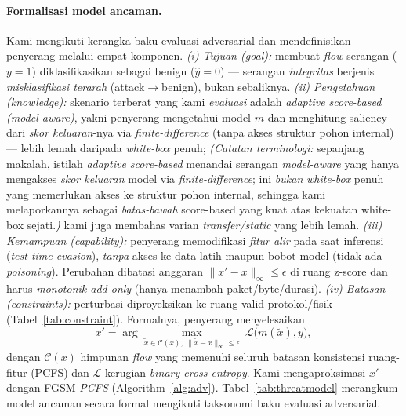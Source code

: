 \documentclass[11pt,a4paper]{article}
\begin{document}
\paragraph{Formalisasi model ancaman.} Kami mengikuti kerangka baku evaluasi
adversarial dan mendefinisikan penyerang melalui empat komponen.
\emph{(i) Tujuan (goal):} membuat \emph{flow} serangan ($y=1$) diklasifikasikan
sebagai benign ($\hat{y}=0$) --- serangan \emph{integritas} berjenis
\emph{misklasifikasi terarah} (attack$\rightarrow$benign), bukan sebaliknya.
\emph{(ii) Pengetahuan (knowledge):} skenario terberat yang kami \emph{evaluasi} adalah \emph{adaptive score-based (model-aware)}, yakni penyerang mengetahui model $m$ dan menghitung saliency dari \emph{skor keluaran}-nya via \emph{finite-difference} (tanpa akses struktur pohon internal) --- lebih lemah daripada \emph{white-box} penuh; \emph{(Catatan terminologi:} sepanjang makalah, istilah \emph{adaptive score-based} menandai serangan \emph{model-aware} yang hanya mengakses \emph{skor keluaran} model via \emph{finite-difference}; ini \emph{bukan} \emph{white-box} penuh yang memerlukan akses ke struktur pohon internal, sehingga kami melaporkannya sebagai \emph{batas-bawah} score-based yang kuat atas kekuatan white-box sejati.\emph{)} kami juga membahas varian \emph{transfer/static} yang
lebih lemah. \emph{(iii) Kemampuan (capability):} penyerang memodifikasi
\emph{fitur alir} pada saat inferensi (\emph{test-time evasion}), \emph{tanpa}
akses ke data latih maupun bobot model (tidak ada \emph{poisoning}). Perubahan
dibatasi anggaran $\lVert x' - x \rVert_\infty \le \epsilon$ di ruang z-score dan
harus \emph{monotonik add-only} (hanya menambah paket/byte/durasi).
\emph{(iv) Batasan (constraints):} perturbasi diproyeksikan ke ruang valid
protokol/fisik (Tabel~\ref{tab:constraint}). Formalnya, penyerang menyelesaikan
\begin{equation}
x' = \arg\max_{\tilde{x}\in \mathcal{C}(x),\ \lVert \tilde{x}-x\rVert_\infty \le \epsilon}
\ \mathcal{L}\big(m(\tilde{x}), y\big),
\end{equation}
dengan $\mathcal{C}(x)$ himpunan \emph{flow} yang memenuhi seluruh batasan
konsistensi ruang-fitur (PCFS) dan $\mathcal{L}$ kerugian \emph{binary
cross-entropy}. Kami mengaproksimasi $x'$ dengan FGSM \emph{PCFS}
(Algorithm~\ref{alg:adv}). Tabel~\ref{tab:threatmodel} merangkum model ancaman
secara formal mengikuti taksonomi baku evaluasi adversarial.
\end{document}
